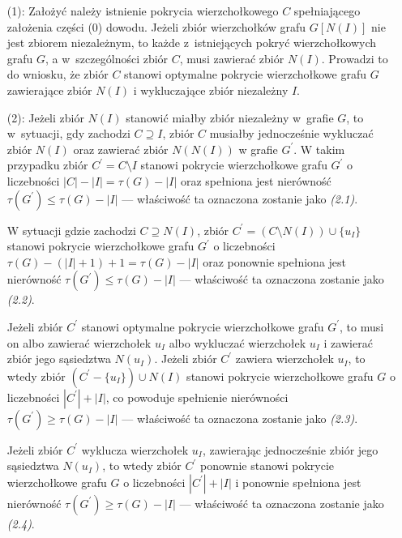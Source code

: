 {\begin{bproof}
\begin{itemize}
      W sytuacji gdy $I = X$, to ponieważ $Y \neq \emptyset$, tak jak w~poprzednim przypadku spełniona jest nierówność $|Y|\geq|I|-|X|+1$.
      Ponieważ zbiór $I$ jest niezależny w~grafie $G$, zastąpienie zbioru $Y \cup X$ zbiorem $N(I)$ w pokryciu wierzchołkowym $C$ owocuje pokryciem wierzchołkowym $C^\prime$ grafu $G$ o liczebności $|C^\prime| \leq |C|$.
      Wobec tego toku rozumowania łatwo zauważyć, że zbiór $C^\prime$ stanowi pokrycie wierzchołkowe grafu $G$ o najmniejszej liczebności, które zawiera zbiór $N(I)$ oraz wyklucza zbiór niezależny $I$.
      \item[(1):] Założyć należy istnienie pokrycia wierzchołkowego $C$ spełniającego założenia części (0) dowodu.
      Jeżeli zbiór wierzchołków grafu $G[N(I)]$ nie jest zbiorem niezależnym, to każde z~istniejących pokryć wierzchołkowych grafu $G$, a w~szczególności zbiór $C$, musi zawierać zbiór $N(I)$.
      Prowadzi to do wniosku, że zbiór $C$ stanowi optymalne pokrycie wierzchołkowe grafu $G$ zawierające zbiór $N(I)$ i wykluczające zbiór niezależny $I$.
      \item[(2):] Jeżeli zbiór $N(I)$ stanowić miałby zbiór niezależny w~grafie $G$, to w~sytuacji, gdy zachodzi $C \supseteq I$, zbiór $C$ musiałby jednocześnie wykluczać zbiór $N(I)$ oraz zawierać zbiór $N(N(I))$ w grafie $G^\prime$.
      W takim przypadku zbiór $C^\prime=C \setminus I$ stanowi pokrycie wierzchołkowe grafu $G^\prime$ o liczebności $|C|-|I|=\tau(G)-|I|$ oraz spełniona jest nierówność $\tau(G^\prime)\leq\tau(G)-|I|$ --- właściwość ta oznaczona zostanie jako \textit{(2.1)}.

      W sytuacji gdzie zachodzi $C \supseteq N(I)$, zbiór $C^\prime=(C \setminus N(I))\cup \{u_I\}$ stanowi pokrycie wierzchołkowe grafu $G^\prime$ o liczebności $\tau(G)-(|I|+1)+1=\tau(G)-|I|$ oraz ponownie spełniona jest nierówność $\tau(G^\prime)\leq\tau(G)-|I|$ --- właściwość ta oznaczona zostanie jako \textit{(2.2)}.

      Jeżeli zbiór $C^\prime$ stanowi optymalne pokrycie wierzchołkowe grafu $G^\prime$, to musi on albo zawierać wierzchołek $u_I$ albo wykluczać wierzchołek $u_I$ i zawierać zbiór jego sąsiedztwa $N(u_I)$.
      Jeżeli zbiór $C^\prime$ zawiera wierzchołek $u_I$, to wtedy zbiór $(C^\prime - \{u_I\}) \cup N(I)$ stanowi pokrycie wierzchołkowe grafu $G$ o liczebności $|C^\prime|+|I|$, co powoduje spełnienie nierówności $\tau(G^\prime)\geq \tau(G)-|I|$ --- właściwość ta oznaczona zostanie jako \textit{(2.3)}.

      Jeżeli zbiór $C^\prime$ wyklucza wierzchołek $u_I$, zawierając jednocześnie zbiór jego sąsiedztwa $N(u_I)$, to wtedy zbiór $C^\prime$ ponownie stanowi pokrycie wierzchołkowe grafu $G$ o liczebności $|C^\prime|+|I|$ i ponownie spełniona jest nierówność $\tau(G^\prime)\geq \tau(G)-|I|$ --- właściwość ta oznaczona zostanie jako \textit{(2.4)}.


\end{itemize}
\end{bproof}}
